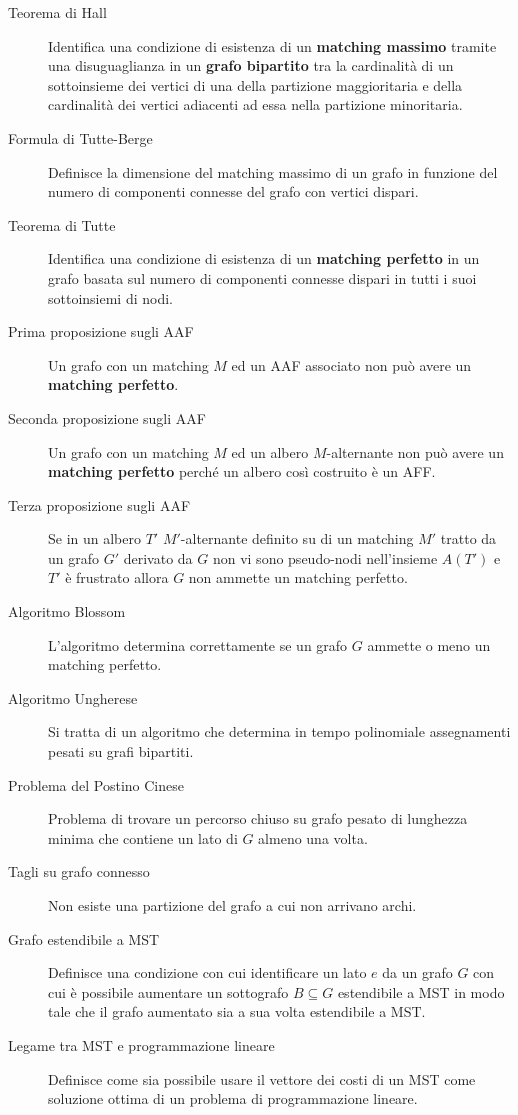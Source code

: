 \documentclass[\main/main.tex]{subfiles}
\begin{document}
\begin{multicols}{2}
\begin{description}
		\item[Teorema di Hall] Identifica una condizione di esistenza di un \textbf{matching massimo} tramite una disuguaglianza in un \textbf{grafo bipartito} tra la cardinalità di un sottoinsieme dei vertici di una della partizione maggioritaria e della cardinalità dei vertici adiacenti ad essa nella partizione minoritaria.
		\item[Formula di Tutte-Berge] Definisce la dimensione del matching massimo di un grafo in funzione del numero di componenti connesse del grafo con vertici dispari.
		\item[Teorema di Tutte] Identifica una condizione di esistenza di un \textbf{matching perfetto} in un grafo basata sul numero di componenti connesse dispari in tutti i suoi sottoinsiemi di nodi.
		\item[Prima proposizione sugli AAF] Un grafo con un matching \(M\) ed un AAF associato non può avere un \textbf{matching perfetto}.
		\item[Seconda proposizione sugli AAF] Un grafo con un matching \(M\) ed un albero \(M\)-alternante non può avere un \textbf{matching perfetto} perché un albero così costruito è un AFF.
		\item[Terza proposizione sugli AAF] Se in un albero \(T'\) \(M'\)-alternante definito su di un matching \(M'\) tratto da un grafo \(G'\) derivato da \(G\) non vi sono pseudo-nodi nell'insieme \(A(T')\) e \(T'\) è frustrato allora \(G\) non ammette un matching perfetto.
		\item[Algoritmo Blossom] L'algoritmo determina correttamente se un grafo \(G\) ammette o meno un matching perfetto.
		\item[Algoritmo Ungherese] Si tratta di un algoritmo che determina in tempo polinomiale assegnamenti pesati su grafi bipartiti.
		\item[Problema del Postino Cinese] Problema di trovare un percorso chiuso su grafo pesato di lunghezza minima che contiene un lato di \(G\) almeno una volta.
		\item[Tagli su grafo connesso] Non esiste una partizione del grafo a cui non arrivano archi.
		\item[Grafo estendibile a MST] Definisce una condizione con cui identificare un lato \(e\) da un grafo \(G\) con cui è possibile aumentare un sottografo \(B\subseteq G\) estendibile a MST in modo tale che il grafo aumentato sia a sua volta estendibile a MST.
		\item[Legame tra MST e programmazione lineare] Definisce come sia possibile usare il vettore dei costi di un MST come soluzione ottima di un problema di programmazione lineare.

\end{description}
\end{multicols}
\end{document}
